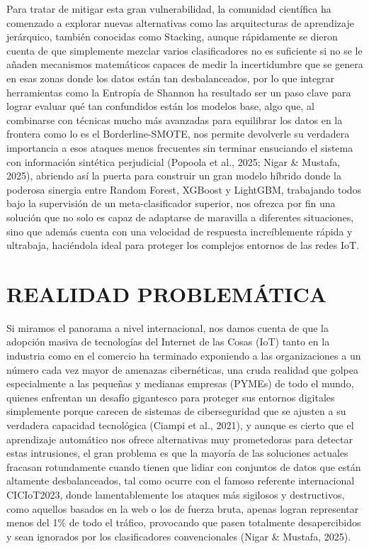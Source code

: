 Para tratar de mitigar esta gran vulnerabilidad, la comunidad científica ha comenzado a explorar nuevas alternativas como las arquitecturas de aprendizaje jerárquico, también conocidas como Stacking, aunque rápidamente se dieron cuenta de que simplemente mezclar varios clasificadores no es suficiente si no se le añaden mecanismos matemáticos capaces de medir la incertidumbre que se genera en esas zonas donde los datos están tan desbalanceados, por lo que integrar herramientas como la Entropía de Shannon ha resultado ser un paso clave para lograr evaluar qué tan confundidos están los modelos base, algo que, al combinarse con técnicas mucho más avanzadas para equilibrar los datos en la frontera como lo es el Borderline-SMOTE, nos permite devolverle su verdadera importancia a esos ataques menos frecuentes sin terminar ensuciando el sistema con información sintética perjudicial (Popoola et al., 2025; Nigar \& Mustafa, 2025), abriendo así la puerta para construir un gran modelo híbrido donde la poderosa sinergia entre Random Forest, XGBoost y LightGBM, trabajando todos bajo la supervisión de un meta-clasificador superior, nos ofrezca por fin una solución que no solo es capaz de adaptarse de maravilla a diferentes situaciones, sino que además cuenta con una velocidad de respuesta increíblemente rápida y ultrabaja, haciéndola ideal para proteger los complejos entornos de las redes IoT.

\section{REALIDAD PROBLEMÁTICA}

Si miramos el panorama a nivel internacional, nos damos cuenta de que la adopción masiva de tecnologías del Internet de las Cosas (IoT) tanto en la industria como en el comercio ha terminado exponiendo a las organizaciones a un número cada vez mayor de amenazas cibernéticas, una cruda realidad que golpea especialmente a las pequeñas y medianas empresas (PYMEs) de todo el mundo, quienes enfrentan un desafío gigantesco para proteger sus entornos digitales simplemente porque carecen de sistemas de ciberseguridad que se ajusten a su verdadera capacidad tecnológica (Ciampi et al., 2021), y aunque es cierto que el aprendizaje automático nos ofrece alternativas muy prometedoras para detectar estas intrusiones, el gran problema es que la mayoría de las soluciones actuales fracasan rotundamente cuando tienen que lidiar con conjuntos de datos que están altamente desbalanceados, tal como ocurre con el famoso referente internacional CICIoT2023, donde lamentablemente los ataques más sigilosos y destructivos, como aquellos basados en la web o los de fuerza bruta, apenas logran representar menos del 1\% de todo el tráfico, provocando que pasen totalmente desapercibidos y sean ignorados por los clasificadores convencionales (Nigar \& Mustafa, 2025).

